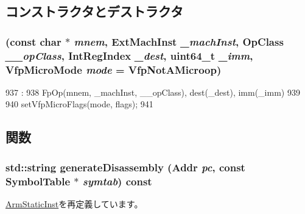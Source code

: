 \subsection{コンストラクタとデストラクタ}
\hypertarget{classArmISA_1_1FpRegImmOp_a855f484865f7972eb6b14d879544af1a}{
\subsubsection[{FpRegImmOp}]{ (const char $\ast$ {\em mnem}, \/  {\bf ExtMachInst} {\em \_\-machInst}, \/  OpClass {\em \_\-\_\-opClass}, \/  {\bf IntRegIndex} {\em \_\-dest}, \/  uint64\_\-t {\em \_\-imm}, \/  {\bf VfpMicroMode} {\em mode} = {\ttfamily VfpNotAMicroop})}}
\label{classArmISA_1_1FpRegImmOp_a855f484865f7972eb6b14d879544af1a}



\begin{DoxyCode}
937                                                    :
938         FpOp(mnem, _machInst, __opClass), dest(_dest), imm(_imm)
939     {
940         setVfpMicroFlags(mode, flags);
941     }

\end{DoxyCode}


\subsection{関数}
\hypertarget{classArmISA_1_1FpRegImmOp_a95d323a22a5f07e14d6b4c9385a91896}{
\subsubsection[{generateDisassembly}]{\setlength{\rightskip}{0pt plus 5cm}std::string generateDisassembly ({\bf Addr} {\em pc}, \/  const SymbolTable $\ast$ {\em symtab}) const}}
\label{classArmISA_1_1FpRegImmOp_a95d323a22a5f07e14d6b4c9385a91896}


\hyperlink{classArmISA_1_1ArmStaticInst_a95d323a22a5f07e14d6b4c9385a91896}{ArmStaticInst}を再定義しています。


